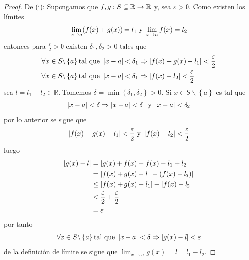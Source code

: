 \documentclass[12pt]{article}
\begin{document}
\begin{enumerate}
    \begin{proof}
        De (i): Supongamos que $f,g:S\subseteq\mathbb{R}\rightarrow\mathbb{R}$ y, sea $\varepsilon>0$. Como existen los límites
        \begin{equation*}
            \lim_{x\rightarrow a}(f(x)+g(x))=l_1\textup{ y }\lim_{x\rightarrow a}f(x)=l_2
        \end{equation*}
        entonces para $\frac{\varepsilon}{2}>0$ existen $\delta_1,\delta_2>0$ tales que
        \begin{equation*}
            \begin{split}
                \forall x\in S\backslash\left\{a \right\} \textup{tal que }\left| x-a \right|<\delta_1&\Rightarrow \left| f(x)+g(x)-l_1 \right|<\frac{\varepsilon}{2}\\
                \forall x\in S\backslash\left\{a \right\} \textup{tal que }\left| x-a \right|<\delta_1&\Rightarrow \left| f(x)-l_2 \right|<\frac{\varepsilon}{2}\\
            \end{split}
        \end{equation*}
        sea $l=l_1-l_2\in\mathbb{R}$. Tomemos $\delta=\min\left\{\delta_1,\delta_2 \right\}>0$. Si $x\in S\backslash\left\{a \right\}$ es tal que
        \begin{equation*}
            \left| x-a \right|<\delta\Rightarrow \left| x-a \right|<\delta_1\textup{ y }\left| x-a \right|<\delta_2
        \end{equation*}
        por lo anterior se sigue que
        \begin{equation*}
            \left| f(x)+g(x)-l_1 \right|<\frac{\varepsilon}{2}\textup{ y }\left| f(x)-l_2 \right|<\frac{\varepsilon}{2}
        \end{equation*}
        luego
        \begin{equation*}
            \begin{split}
                \left| g(x)-l \right|&=\left| g(x)+f(x)-f(x)-l_1+l_2 \right|\\
                &=\left| f(x)+g(x)-l_1-(f(x)-l_2) \right|\\
                &\leq\left| f(x)+g(x)-l_1 \right|+\left| f(x)-l_2 \right|\\
                &<\frac{\varepsilon}{2}+\frac{\varepsilon}{2}\\
                &=\varepsilon\\
            \end{split}
        \end{equation*}
        por tanto
        \begin{equation*}
            \forall x\in S\backslash\left\{a \right\} \textup{tal que }\left| x-a \right|<\delta\Rightarrow \left| g(x)-l \right|<\varepsilon
        \end{equation*}
        de la definición de límite se sigue que $\lim_{x \rightarrow a}g(x)=l=l_1-l_2$.


\end{proof}
\end{enumerate}
\end{document}

